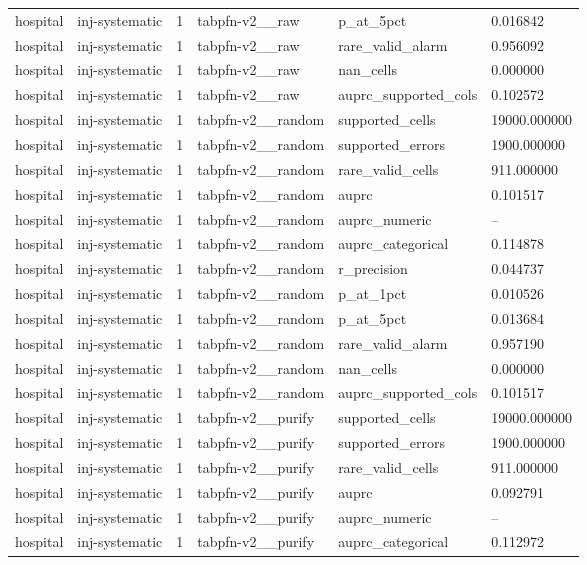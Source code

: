 \begin{tabular}{llllll}
hospital & inj-systematic & 1 & tabpfn-v2\_\_raw & p\_at\_5pct & 0.016842 \\
hospital & inj-systematic & 1 & tabpfn-v2\_\_raw & rare\_valid\_alarm & 0.956092 \\
hospital & inj-systematic & 1 & tabpfn-v2\_\_raw & nan\_cells & 0.000000 \\
hospital & inj-systematic & 1 & tabpfn-v2\_\_raw & auprc\_supported\_cols & 0.102572 \\
hospital & inj-systematic & 1 & tabpfn-v2\_\_random & supported\_cells & 19000.000000 \\
hospital & inj-systematic & 1 & tabpfn-v2\_\_random & supported\_errors & 1900.000000 \\
hospital & inj-systematic & 1 & tabpfn-v2\_\_random & rare\_valid\_cells & 911.000000 \\
hospital & inj-systematic & 1 & tabpfn-v2\_\_random & auprc & 0.101517 \\
hospital & inj-systematic & 1 & tabpfn-v2\_\_random & auprc\_numeric & -- \\
hospital & inj-systematic & 1 & tabpfn-v2\_\_random & auprc\_categorical & 0.114878 \\
hospital & inj-systematic & 1 & tabpfn-v2\_\_random & r\_precision & 0.044737 \\
hospital & inj-systematic & 1 & tabpfn-v2\_\_random & p\_at\_1pct & 0.010526 \\
hospital & inj-systematic & 1 & tabpfn-v2\_\_random & p\_at\_5pct & 0.013684 \\
hospital & inj-systematic & 1 & tabpfn-v2\_\_random & rare\_valid\_alarm & 0.957190 \\
hospital & inj-systematic & 1 & tabpfn-v2\_\_random & nan\_cells & 0.000000 \\
hospital & inj-systematic & 1 & tabpfn-v2\_\_random & auprc\_supported\_cols & 0.101517 \\
hospital & inj-systematic & 1 & tabpfn-v2\_\_purify & supported\_cells & 19000.000000 \\
hospital & inj-systematic & 1 & tabpfn-v2\_\_purify & supported\_errors & 1900.000000 \\
hospital & inj-systematic & 1 & tabpfn-v2\_\_purify & rare\_valid\_cells & 911.000000 \\
hospital & inj-systematic & 1 & tabpfn-v2\_\_purify & auprc & 0.092791 \\
hospital & inj-systematic & 1 & tabpfn-v2\_\_purify & auprc\_numeric & -- \\
hospital & inj-systematic & 1 & tabpfn-v2\_\_purify & auprc\_categorical & 0.112972 \\

\end{tabular}
